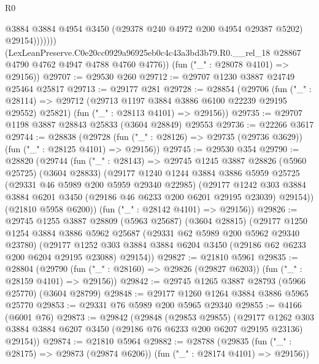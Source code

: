 \begin{lexlean}{R0}
\begin{coremodule}
                      @3884
                      @3884
                      @4954
                      @3450
                      (@29378 @240 @4972 @200 @4954 @29387 @5202)
                      @29154)))))))
        (LexLeanPreserve.C0e20cc0929a96925eb0c4c43a3bd3b79.R0.__rel_18
          @28867
          @4790
          @4762
          @4947
          @4788
          @4760
          @4776))
      (fun ("_" : @28078 @4101) => @29156))
@29707 := @29530 @260
@29712 := @29707 @1230 @3887 @24749 @25464 @25817
@29713 := @29177 @281
@29728 := @28854
    (@29706
      (fun ("_" : @28114) => @29712 (@29713 @1197 @3884 @3886 @6100 @22239 @29195 @29552) @25821)
      (fun ("_" : @28113 @4101) => @29156))
@29735 := @29707 @1198 @3887 @28843 @25833 (@3604 @28849) @29553
@29736 := @22266 @3617
@29744 := @28838
    (@29728 (fun ("_" : @28126) => @29735 (@29736 @3629)) (fun ("_" : @28125 @4101) => @29156))
@29745 := @29530 @354
@29790 := @28820
    (@29744
      (fun ("_" : @28143) =>
      @29745
        @1245
        @3887
        @28826
        (@5960 @25725)
        (@3604 @28833)
        (@29177
          @1240
          @1244
          @3884
          @3886
          @5959
          @25725
          (@29331 @46 @5989 @200 @5959 @29340 @22985)
          (@29177
            @1242
            @303
            @3884
            @3884
            @6201
            @3450
            (@29186 @46 @6233 @200 @6201 @29195 @23039)
            @29154))
        (@21810 @5958 @6200))
      (fun ("_" : @28142 @4101) => @29156))
@29826 := @29745
    @1255
    @3887
    @28809
    (@5963 @25687)
    (@3604 @28815)
    (@29177
      @1250
      @1254
      @3884
      @3886
      @5962
      @25687
      (@29331 @62 @5989 @200 @5962 @29340 @23780)
      (@29177
        @1252
        @303
        @3884
        @3884
        @6204
        @3450
        (@29186 @62 @6233 @200 @6204 @29195 @23088)
        @29154))
@29827 := @21810 @5961
@29835 := @28804
    (@29790 (fun ("_" : @28160) => @29826 (@29827 @6203)) (fun ("_" : @28159 @4101) => @29156))
@29842 := @29745 @1265 @3887 @28793 (@5966 @25770) (@3604 @28799)
@29848 := @29177 @1260 @1264 @3884 @3886 @5965 @25770
@29853 := @29331 @76 @5989 @200 @5965 @29340
@29855 := @4166 (@6001 @76)
@29873 := @29842
    (@29848
      (@29853 @29855)
      (@29177
        @1262
        @303
        @3884
        @3884
        @6207
        @3450
        (@29186 @76 @6233 @200 @6207 @29195 @23136)
        @29154))
@29874 := @21810 @5964
@29882 := @28788
    (@29835 (fun ("_" : @28175) => @29873 (@29874 @6206)) (fun ("_" : @28174 @4101) => @29156))

\end{coremodule}
\end{lexlean}
